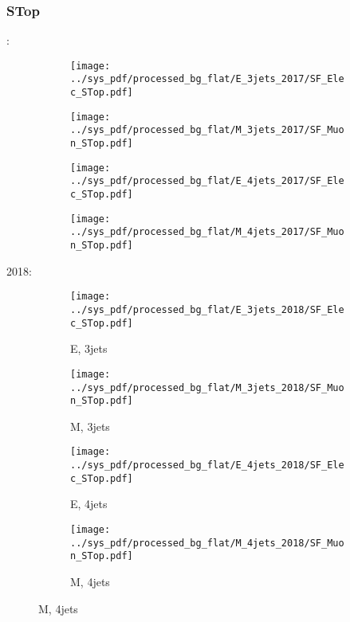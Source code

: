 \documentclass{beamer}
\begin{document}
\begin{frame}
\frametitle{STop}
\fontsize{5}{1}:
\begin{figure}
\centering
\begin{subfigure}[b]{0.24\textwidth}
\texttt{[image: ../sys\_pdf/processed\_bg\_flat/E\_3jets\_2017/SF\_Elec\_STop.pdf]}
\end{subfigure}
\begin{subfigure}[b]{0.24\textwidth}
\texttt{[image: ../sys\_pdf/processed\_bg\_flat/M\_3jets\_2017/SF\_Muon\_STop.pdf]}
\end{subfigure}
\begin{subfigure}[b]{0.24\textwidth}
\texttt{[image: ../sys\_pdf/processed\_bg\_flat/E\_4jets\_2017/SF\_Elec\_STop.pdf]}
\end{subfigure}
\begin{subfigure}[b]{0.24\textwidth}
\texttt{[image: ../sys\_pdf/processed\_bg\_flat/M\_4jets\_2017/SF\_Muon\_STop.pdf]}
\end{subfigure}
\end{figure}
2018:
\begin{figure}
\centering
\begin{subfigure}[b]{0.24\textwidth}
\texttt{[image: ../sys\_pdf/processed\_bg\_flat/E\_3jets\_2018/SF\_Elec\_STop.pdf]}
\captionsetup{font=tiny}
\caption{E, 3jets}
\end{subfigure}
\begin{subfigure}[b]{0.24\textwidth}
\texttt{[image: ../sys\_pdf/processed\_bg\_flat/M\_3jets\_2018/SF\_Muon\_STop.pdf]}
\captionsetup{font=tiny}
\caption{M, 3jets}
\end{subfigure}
\begin{subfigure}[b]{0.24\textwidth}
\texttt{[image: ../sys\_pdf/processed\_bg\_flat/E\_4jets\_2018/SF\_Elec\_STop.pdf]}
\captionsetup{font=tiny}
\caption{E, 4jets}
\end{subfigure}
\begin{subfigure}[b]{0.24\textwidth}
\texttt{[image: ../sys\_pdf/processed\_bg\_flat/M\_4jets\_2018/SF\_Muon\_STop.pdf]}
\captionsetup{font=tiny}
\caption{M, 4jets}
\end{subfigure}
\end{figure}
\end{frame}
\end{document}
